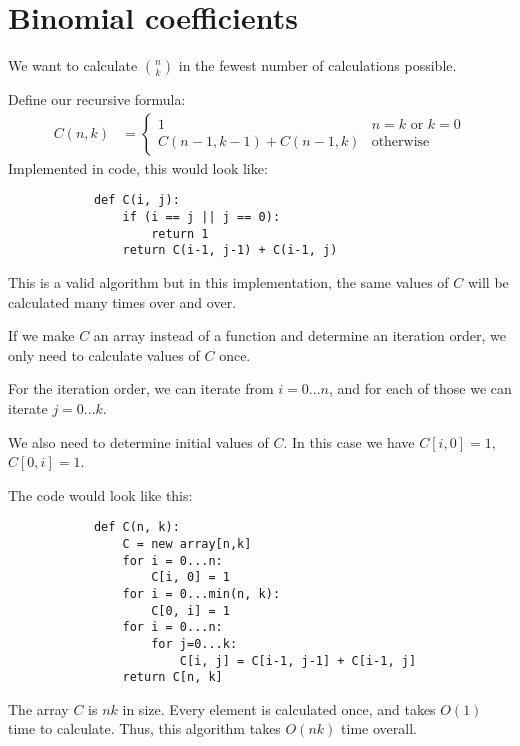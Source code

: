     \section{Binomial coefficients}
        We want to calculate ${n \choose k}$ in the fewest number of
        calculations possible.

        Define our recursive formula:
        \begin{align*}
            C(n, k) &=
            \left\{
                \begin{array}{lr}
                    1 & n = k \text{ or } k = 0 \\
                    C(n-1, k-1) + C(n-1, k) & \text{otherwise}
                \end{array}
            \right.
        \end{align*}
        Implemented in code, this would look like:
        \begin{verbatim}
            def C(i, j):
                if (i == j || j == 0):
                    return 1
                return C(i-1, j-1) + C(i-1, j)
        \end{verbatim}
        This is a valid algorithm but in this implementation, the same values of
        $C$ will be calculated many times over and over.

        If we make $C$ an array instead of a function and determine an
        iteration order, we only need to calculate values of $C$ once.

        For the iteration order, we can iterate from $i = 0...n$, and for each of
        those we can iterate $j = 0...k$.

        We also need to determine initial values of $C$. In this case we have
        $C[i, 0] = 1$, $C[0, i] = 1$.

        The code would look like this:
        \begin{verbatim}
            def C(n, k):
                C = new array[n,k]
                for i = 0...n:
                    C[i, 0] = 1
                for i = 0...min(n, k):
                    C[0, i] = 1
                for i = 0...n:
                    for j=0...k:
                        C[i, j] = C[i-1, j-1] + C[i-1, j]
                return C[n, k]
        \end{verbatim}

        The array $C$ is $nk$ in size.
        Every element is calculated once, and takes $O(1)$ time to calculate.
        Thus, this algorithm takes $O(nk)$ time overall.

